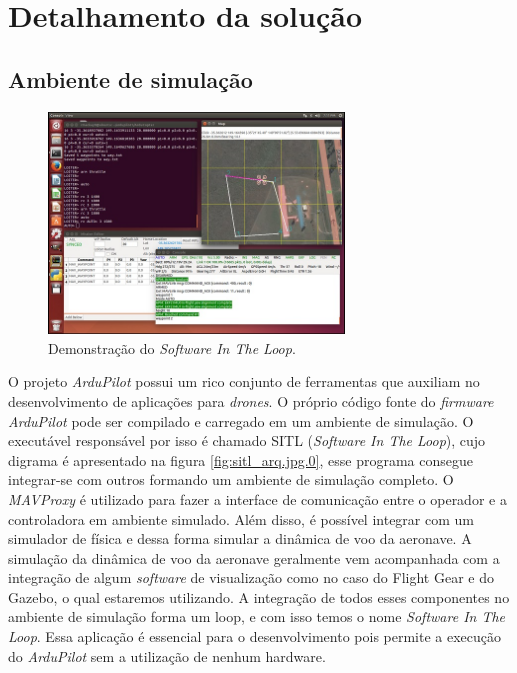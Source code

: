 \documentclass[12pt,a4paper,oneside]{book}
\begin{document}
%
\chapter{Detalhamento da solução}
%
\thispagestyle{empty} 
%

\section{Ambiente de simulação}
%
\begin{figure}[!htbp]
  \centering
  \includegraphics[width=0.7\textwidth]{Images/Desenvolvimento/sitl_demo.jpg}
  \caption{Demonstração do \textit{Software In The Loop}.}
  \label{fig:sitl_demo.jpg.0}
\end{figure}
%

O projeto \textit{ArduPilot} possui um rico conjunto de ferramentas que auxiliam no desenvolvimento de aplicações para \textit{drones}. O próprio código fonte do \textit{firmware} \textit{ArduPilot} pode ser compilado e carregado em um ambiente de simulação. O executável responsável por isso é chamado SITL (\textit{Software In The Loop}), cujo digrama é apresentado na figura \ref{fig:sitl_arq.jpg.0}, esse programa consegue integrar-se com outros formando um ambiente de simulação completo. O \textit{MAVProxy} é utilizado para fazer a interface de comunicação entre o operador e a controladora em ambiente simulado. Além disso, é possível integrar com um simulador de física e dessa forma simular a dinâmica de voo da aeronave. A simulação da dinâmica de voo da aeronave geralmente vem acompanhada com a integração de algum \textit{software} de visualização como no caso do Flight Gear e do Gazebo, o qual estaremos utilizando. A integração de todos esses componentes no ambiente de simulação forma um loop, e com isso temos o nome \textit{Software In The Loop}. Essa aplicação é essencial para o desenvolvimento pois permite a execução do \textit{ArduPilot} sem a utilização de nenhum hardware.
\end{document}
